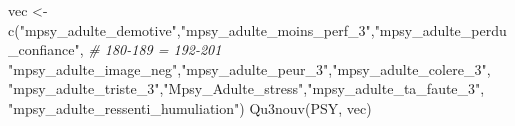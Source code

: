 \documentclass[
]{article}
\newenvironment{Shaded}{\begin{snugshade}}{\end{snugshade}}
\newcommand{\CommentTok}[1]{\textcolor[rgb]{0.56,0.35,0.01}{\textit{#1}}}
\newcommand{\FunctionTok}[1]{\textcolor[rgb]{0.00,0.00,0.00}{#1}}
\newcommand{\NormalTok}[1]{#1}
\newcommand{\OtherTok}[1]{\textcolor[rgb]{0.56,0.35,0.01}{#1}}
\newcommand{\StringTok}[1]{\textcolor[rgb]{0.31,0.60,0.02}{#1}}
\begin{document}
\begin{Shaded}
\begin{Highlighting}[]
\NormalTok{vec }\OtherTok{\textless{}{-}} \FunctionTok{c}\NormalTok{(}\StringTok{"mpsy\_adulte\_demotive"}\NormalTok{,}\StringTok{"mpsy\_adulte\_moins\_perf\_3"}\NormalTok{,}\StringTok{"mpsy\_adulte\_perdu\_confiance"}\NormalTok{,  }\CommentTok{\# 180{-}189 = 192{-}201}
    \StringTok{"mpsy\_adulte\_image\_neg"}\NormalTok{,}\StringTok{"mpsy\_adulte\_peur\_3"}\NormalTok{,}\StringTok{"mpsy\_adulte\_colere\_3"}\NormalTok{,}
    \StringTok{"mpsy\_adulte\_triste\_3"}\NormalTok{,}\StringTok{"Mpsy\_Adulte\_stress"}\NormalTok{,}\StringTok{"mpsy\_adulte\_ta\_faute\_3"}\NormalTok{,}
    \StringTok{"mpsy\_adulte\_ressenti\_humuliation"}\NormalTok{)}
\FunctionTok{Qu3nouv}\NormalTok{(PSY, vec)}
\end{Highlighting}
\end{Shaded}
\end{document}
